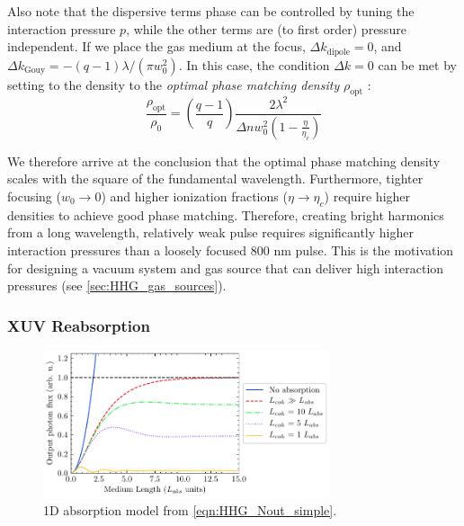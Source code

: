 Also note that the dispersive terms phase can be controlled by tuning the interaction pressure $p$, while the other terms are (to first order) pressure independent. If we place the gas medium at the focus, $\Delta k_{\textrm{dipole}} = 0$, and $\Delta k_{\textrm{Gouy}} = -(q-1) \lambda / (\pi w_0^2)$. In this case, the condition $\Delta k = 0$ can be met by setting to the density to the \textit{optimal phase matching density} $\rho_{\textrm{opt}}$ \cite{rothhardtAbsorptionlimitedPhasematchedHigh2014}:
\begin{equation}
\frac{\rho_{\textrm{opt}}}{\rho_0} = \left( \frac{q-1}{q} \right) \frac{2 \lambda^2}{\Delta n w_0^2 \left(1 - \frac{\eta}{\eta_c}\right)}
\label{eqn:phase_matching_density}
\end{equation}



We therefore arrive at the conclusion that the optimal phase matching density scales with the square of the fundamental wavelength. Furthermore, tighter focusing (${w_0 \rightarrow 0}$) and higher ionization fractions (${\eta \rightarrow \eta_c}$) require higher densities to achieve good phase matching. Therefore, creating bright harmonics from a long wavelength, relatively weak pulse requires significantly higher interaction pressures than a loosely focused 800 nm pulse. This is the motivation for designing a vacuum system and gas source that can deliver high interaction pressures (see \cref{sec:HHG_gas_sources}).

\subsubsection{XUV Reabsorption}
\label{sec:XUV_reabsorption}

\begin{figure}
	\centering
	\includegraphics[width=0.75\textwidth]{figures/chap1/Constant1999_fig1.pdf}
	\caption{1D absorption model from \cref{eqn:HHG_Nout_simple}.}
	\label{fig:Constant1999_fig1}
\end{figure}

